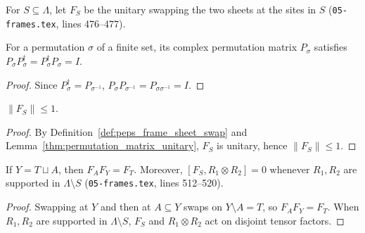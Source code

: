 \begin{definition}
    \label{def:peps_frame_sheet_swap}
    \leanok
    For $S\subseteq\Lambda$, let $F_S$ be the unitary swapping the two sheets
    at the sites in $S$ (\texttt{05-frames.tex}, lines 476--477).
\end{definition}

\begin{lemma}
    \label{thm:permutation_matrix_unitary}
    \leanok
    For a permutation $\sigma$ of a finite set, its complex permutation matrix
    $P_\sigma$ satisfies $P_\sigma P_\sigma^\dagger=P_\sigma^\dagger P_\sigma=I$.
\end{lemma}

\begin{proof}\leanok
    Since $P_\sigma^\dagger=P_{\sigma^{-1}}$,
    $P_\sigma P_{\sigma^{-1}}=P_{\sigma\sigma^{-1}}=I$.
\end{proof}

\begin{lemma}
    \label{thm:peps_frame_sheet_swap_norm}
    \leanok
    $\|F_S\|\leq1$.
\end{lemma}

\begin{proof}\leanok
    By Definition~\ref{def:peps_frame_sheet_swap} and
    Lemma~\ref{thm:permutation_matrix_unitary}, $F_S$ is unitary, hence
    $\|F_S\|\le 1$.
\end{proof}

\begin{lemma}
    \label{lem:peps_frame_sheet_swap_compose}
    \leanok
    If $Y=T\sqcup A$, then $F_AF_Y=F_T$. Moreover, $[F_S,R_1\otimes R_2]=0$
    whenever $R_1,R_2$ are supported in $\Lambda\setminus S$
    (\texttt{05-frames.tex}, lines 512--520).
\end{lemma}

\begin{proof}\leanok
    Swapping at $Y$ and then at $A\subseteq Y$ swaps on $Y\setminus A=T$, so
    $F_AF_Y=F_T$. When $R_1,R_2$ are supported in $\Lambda\setminus S$,
    $F_S$ and $R_1\otimes R_2$ act on disjoint tensor factors.
\end{proof}

